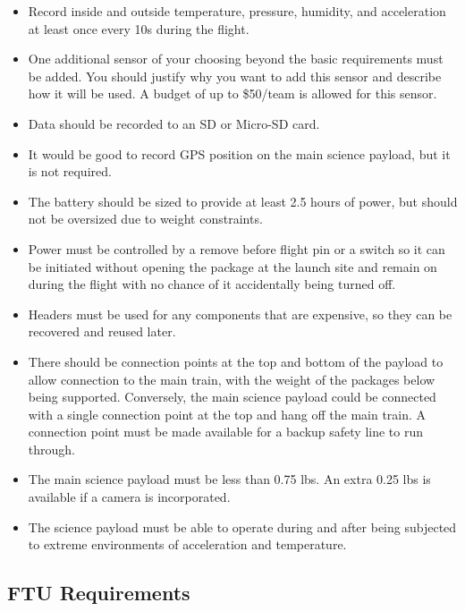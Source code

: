 \documentclass[11pt]{article}
\begin{document}
\begin{itemize}
  \item Record inside and outside temperature, pressure, humidity, and
    acceleration at least once every 10s during the flight.
  \item One additional sensor of your choosing beyond the basic
    requirements must be added.  You should justify why you want to
    add this sensor and describe how it will be used.  A budget of up
    to \$50/team is allowed for this sensor.
  \item Data should be recorded to an SD or Micro-SD card.
  \item It would be good to record GPS position on the main science
    payload, but it is not required.
  \item The battery should be sized to provide at least 2.5 hours of
     power, but should not be oversized due to weight constraints.
  \item Power must be controlled by a remove before flight pin or a
      switch so it can be initiated without opening the package at the
      launch site and remain on during the flight with no chance of it
      accidentally being turned off.
  \item Headers must be used for any components that are expensive,
      so they can be recovered and reused later.
  \item There should be connection points at the top and bottom of
      the payload to allow connection to the main train, with the
      weight of the packages below being supported. Conversely, the
      main science payload could be connected with a single connection
      point at the top and hang off the main train. A connection point
      must be made available for a backup safety line to run through.
  \item The main science payload must be less than 0.75 lbs. An
      extra 0.25 lbs is available if a camera is incorporated.
  \item The science payload must be able to operate during and after
    being subjected to extreme environments of acceleration and
    temperature.
\end{itemize}


\subsection{FTU Requirements}
\end{document}
